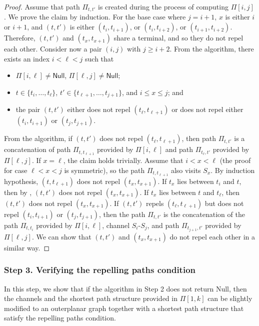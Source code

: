 \documentclass[11pt]{article}
\begin{document}
\begin{proof}
Assume that path $\Pi_{t,t'}$ is created during the process of computing $\Pi[i,j]$. We prove the claim by induction. For the base case where $j = i + 1$, $x$ is either $i$ or $i+1$, and $(t,t')$ is either $(t_{i},t_{i+1})$, or $(t_{i},t_{i+2})$, or $(t_{i+1},t_{i+2})$. Therefore, $(t,t')$ and $(t_x,t_{x+1})$ share a terminal, and so they do not repel each other.
Consider now a pair $(i,j)$ with $j\ge i+2$. From the algorithm, there exists an index $i<\ell<j$ such that
\begin{itemize}
    \item $\Pi[i,\ell]\ne \textsf{Null}$, $\Pi[\ell,j]\ne \textsf{Null}$;
    \item $t\in\{t_i,\dots,t_{\ell}\}$, $t' \in \{t_{\ell+1},\dots,t_{j+1}\}$, and $i\le x\le j$; and
    \item the pair $(t,t')$ either does not repel $(t_{\ell},t_{\ell+1})$ or does not repel either $(t_i,t_{i+1})$ or $(t_j,t_{j+1})$.
\end{itemize}

From the algorithm, if $(t,t')$ does not repel $(t_{\ell},t_{\ell+1})$, then path $\Pi_{t,t'}$ is a concatenation of path $\Pi_{t,t_{\ell+1}}$ provided by $\Pi[i,\ell]$ and path
$\Pi_{{t_\ell},t'}$ provided by $\Pi[\ell,j]$. If $x=\ell$, the claim holds trivially. 
Assume that $i<x<\ell$ (the proof for case $\ell<x<j$ is symmetric),
so the path $\Pi_{t,t_{\ell+1}}$ also visits $S_x$. By induction hypothesis, $(t,t_{\ell+1})$ does not repel $(t_x,t_{x+1})$. 
%
If $t_x$ lies between $t_i$ and $t$, then by , $(t,t')$ does not repel $(t_x,t_{x+1})$. 
If $t_x$ lies between $t$ and $t_{\ell}$, then  $(t,t')$ does not repel $(t_x,t_{x+1})$. 
%
If $(t,t')$ repels $(t_{\ell},t_{\ell+1})$ but does not repel $(t_i,t_{i+1})$ or $(t_j,t_{j+1})$, then the path $\Pi_{t,t'}$ is the concatenation of the path $\Pi_{t,t_i}$ provided by $\Pi[i,\ell]$, channel $S_i$-$S_j$, and path $\Pi_{t_{j+1},t'}$ provided by $\Pi[\ell,j]$. We can show that $(t, t')$ and $(t_x, t_{x+1})$ do not repel each other in a similar way.
\end{proof}




\subsubsection*{Step 3. Verifying the repelling paths condition}

In this step, we show that if the algorithm in Step 2 does not return \textsf{Null}, then the channels and the shortest path structure provided in $\Pi[1,k]$ can be slightly modified to an outerplanar graph together with a shortest path structure that satisfy the repelling paths condition.
\end{document}
